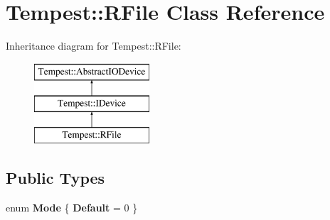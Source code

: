 \hypertarget{class_tempest_1_1_r_file}{\section{Tempest\+:\+:R\+File Class Reference}
\label{class_tempest_1_1_r_file}
}
Inheritance diagram for Tempest\+:\+:R\+File\+:\begin{figure}[H]
\begin{center}
\leavevmode
\includegraphics[height=3.000000cm]{class_tempest_1_1_r_file}
\end{center}
\end{figure}
\subsection*{Public Types}
\begin{DoxyCompactItemize}
\item 
\hypertarget{class_tempest_1_1_r_file_a2cefc54fc3067ea4c6a34e6111676556}{enum {\bfseries Mode} \{ {\bfseries Default} = 0
 \}}\label{class_tempest_1_1_r_file_a2cefc54fc3067ea4c6a34e6111676556}

\end{DoxyCompactItemize}
